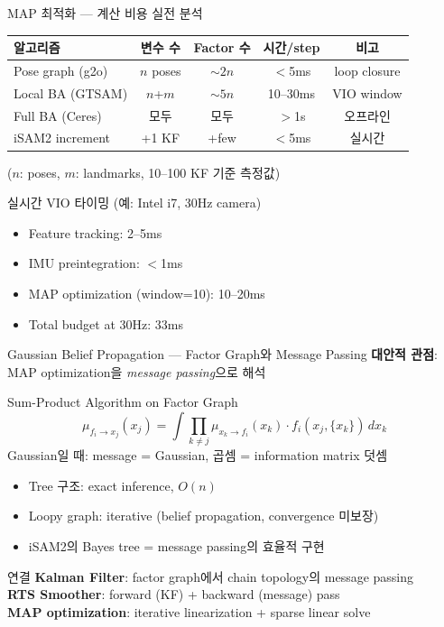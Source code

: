 \begin{frame}{MAP 최적화 — 계산 비용 실전 분석}
  \begin{center}
  \begin{tabular}{lcccc}
    \toprule
    \textbf{알고리즘} & \textbf{변수 수} & \textbf{Factor 수} & \textbf{시간/step} & \textbf{비고} \\
    \midrule
    Pose graph (g2o) & $n$ poses & $\sim 2n$ & $<$5ms & loop closure \\
    Local BA (GTSAM) & $n$+$m$ & $\sim 5n$ & 10--30ms & VIO window \\
    Full BA (Ceres) & 모두 & 모두 & $>$1s & 오프라인 \\
    iSAM2 increment & +1 KF & +few & $<$5ms & 실시간 \\
    \bottomrule
  \end{tabular}
  \end{center}
  ($n$: poses, $m$: landmarks, 10--100 KF 기준 측정값)
  \pause
  \vspace{0.3em}
  \begin{block}{실시간 VIO 타이밍 (예: Intel i7, 30Hz camera)}
    \begin{itemize}
      \item Feature tracking: 2--5ms
      \item IMU preintegration: $<$1ms
      \item MAP optimization (window=10): 10--20ms
      \item Total budget at 30Hz: 33ms
    \end{itemize}
  \end{block}
\end{frame}

\begin{frame}{Gaussian Belief Propagation — Factor Graph와 Message Passing}
  \textbf{대안적 관점}: MAP optimization을 \emph{message passing}으로 해석
  \begin{block}{Sum-Product Algorithm on Factor Graph}
    \[
      \mu_{f_i \to x_j}(x_j) = \int \prod_{k \neq j} \mu_{x_k \to f_i}(x_k) \cdot f_i(x_j, \{x_k\})\, dx_k
    \]
    Gaussian일 때: message = Gaussian, 곱셈 = information matrix 덧셈
  \end{block}
  \pause
  \begin{itemize}
    \item Tree 구조: exact inference, $O(n)$
    \item Loopy graph: iterative (belief propagation, convergence 미보장)
    \item iSAM2의 Bayes tree = message passing의 효율적 구현
  \end{itemize}
  \pause
  \begin{exampleblock}{연결}
    \textbf{Kalman Filter}: factor graph에서 chain topology의 message passing\\
    \textbf{RTS Smoother}: forward (KF) + backward (message) pass\\
    \textbf{MAP optimization}: iterative linearization + sparse linear solve
  \end{exampleblock}
\end{frame}

